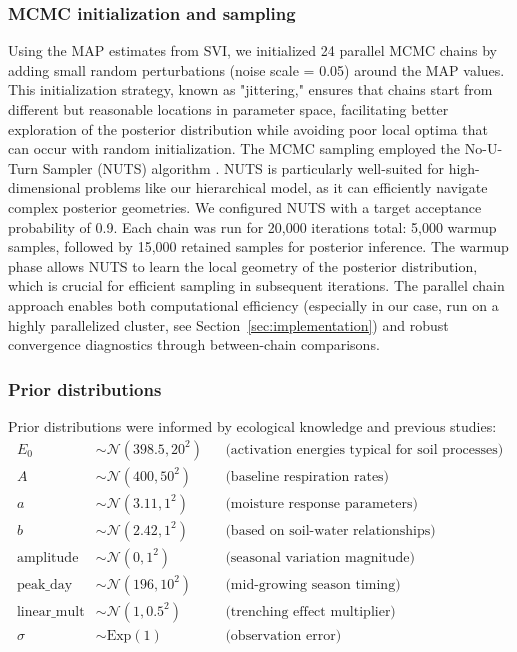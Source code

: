 \documentclass[12pt,a4paper]{article}
\begin{document}
\subsubsection{MCMC initialization and sampling}

Using the MAP estimates from SVI, we initialized 24 parallel MCMC chains by adding small random perturbations (noise scale = 0.05) around the MAP values. This initialization strategy, known as "jittering," ensures that chains start from different but reasonable locations in parameter space, facilitating better exploration of the posterior distribution while avoiding poor local optima that can occur with random initialization.
The MCMC sampling employed the No-U-Turn Sampler (NUTS) algorithm \citep{hoffman2014nuts}. NUTS is particularly well-suited for high-dimensional problems like our hierarchical model, as it can efficiently navigate complex posterior geometries. We configured NUTS with a target acceptance probability of 0.9.
Each chain was run for 20,000 iterations total: 5,000 warmup samples, followed by 15,000 retained samples for posterior inference. The warmup phase allows NUTS to learn the local geometry of the posterior distribution, which is crucial for efficient sampling in subsequent iterations. The parallel chain approach enables both computational efficiency (especially in our case, run on a highly parallelized cluster, see Section~\ref{sec:implementation}) and robust convergence diagnostics through between-chain comparisons.

\subsubsection{Prior distributions}
Prior distributions were informed by ecological knowledge and previous studies:
\begin{align}
E_0 &\sim \mathcal{N}(398.5, 20^2) && \text{(activation energies typical for soil processes)} \\
A &\sim \mathcal{N}(400, 50^2) && \text{(baseline respiration rates)} \\
a &\sim \mathcal{N}(3.11, 1^2) && \text{(moisture response parameters)} \\
b &\sim \mathcal{N}(2.42, 1^2) && \text{(based on soil-water relationships)} \\
\text{amplitude} &\sim \mathcal{N}(0, 1^2) && \text{(seasonal variation magnitude)} \\
\text{peak\_day} &\sim \mathcal{N}(196, 10^2) && \text{(mid-growing season timing)} \\
\text{linear\_mult} &\sim \mathcal{N}(1, 0.5^2) && \text{(trenching effect multiplier)} \\
\sigma &\sim \text{Exp}(1) && \text{(observation error)}
\end{align}
\end{document}
